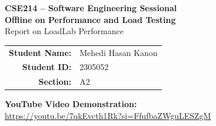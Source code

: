\documentclass[11pt,a4paper]{article}
\newcommand{\studentname}{Mehedi Hasan Kanon}
\newcommand{\studentid}{2305052}
\newcommand{\sectionname}{A2}
\newcommand{\videolink}{https://youtu.be/7qkEvcth1Rk?si=FfufbaZWguLESZgM}
\begin{document}
\begin{titlepage}
    \centering
    \vspace*{1.2cm}

    {\Large \textbf{CSE214 -- Software Engineering Sessional}}\\[0.5cm]
    {\LARGE \textbf{Offline on Performance and Load Testing}}\\[0.4cm]
    {\large Report on LoadLab Performance}\\[1.5cm]

    \begin{tabular}{rl}
        \textbf{Student Name:} & \studentname\\
        \textbf{Student ID:} & \studentid\\
        \textbf{Section:} & \sectionname\\
    \end{tabular}

    \vfill

    \textbf{YouTube Video Demonstration: }\\
    \url{\videolink}

    \vfill
\end{titlepage}






\end{document}
